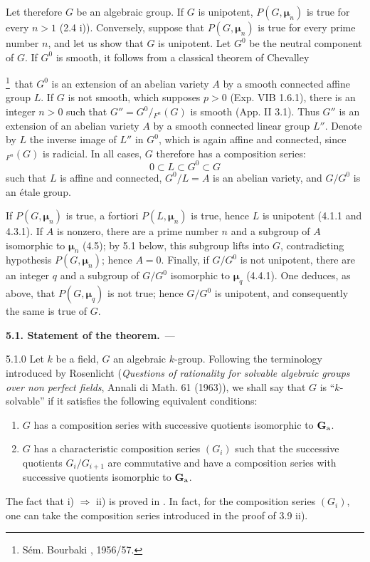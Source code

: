 Let therefore $G$ be an algebraic group. If $G$ is unipotent, $P(G,\boldsymbol\mu_n)$ is true for every $n>1$ (2.4 i)). Conversely, suppose that $P(G,\boldsymbol\mu_n)$ is true for every prime number $n$, and let us show that $G$ is unipotent. Let $G^0$ be the neutral component of $G$. If $G^0$ is smooth, it follows from a classical theorem of Chevalley\begingroup\renewcommand{\thefootnote}{*}\addtocounter{footnote}{-1}\footnote{Sém. Bourbaki , 1956/57.}\endgroup\ that $G^0$ is an extension of an abelian variety $A$ by a smooth connected affine group $L$. If $G$ is not smooth, which supposes $p>0$ (Exp. VIB 1.6.1), there is an integer $n>0$ such that $G''=G^0/{}_{F^n}(G)$ is smooth (App. II 3.1). Thus $G''$ is an extension of an abelian variety $A$ by a smooth connected linear group $L''$. Denote by $L$ the inverse image of $L''$ in $G^0$, which is again affine and connected, since ${}_{F^n}(G)$ is radicial. In all cases, $G$ therefore has a composition series:
\[
 0\subset L\subset G^0\subset G
\]
such that $L$ is affine and connected, $G^0/L=A$ is an abelian variety, and $G/G^0$ is an étale group.

If $P(G,\boldsymbol\mu_n)$ is true, a fortiori $P(L,\boldsymbol\mu_n)$ is true, hence $L$ is unipotent (4.1.1 and 4.3.1). If $A$ is nonzero, there are a prime number $n$ and a subgroup of $A$ isomorphic to $\boldsymbol\mu_n$ (4.5); by 5.1 below, this subgroup lifts into $G$, contradicting hypothesis $P(G,\boldsymbol\mu_n)$; hence $A=0$. Finally, if $G/G^0$ is not unipotent, there are an integer $q$ and a subgroup of $G/G^0$ isomorphic to $\boldsymbol\mu_q$ (4.4.1).
One deduces, as above, that $P(G,\boldsymbol\mu_q)$ is not true; hence $G/G^0$ is unipotent, and consequently the same is true of $G$.

\par\medskip\noindent\textbf{5.1. Statement of the theorem.}\ ---\par\label{XVII.5.1}
\begin{definition}{5.1.0}\label{XVII.5.1.0}
Let $k$ be a field, $G$ an algebraic $k$-group. Following the terminology introduced by Rosenlicht (\emph{Questions of rationality for solvable algebraic groups over non perfect fields}, Annali di Math. 61 (1963)), we shall say that $G$ is ``$k$-solvable'' if it satisfies the following equivalent conditions:
\begin{enumerate}[label=\textup{\roman*)}]
\item $G$ has a composition series with successive quotients isomorphic to $\mathbf{G}_{\mathrm{a}}$.
\item $G$ has a characteristic composition series $(G_i)$ such that the successive quotients $G_i/G_{i+1}$ are commutative and have a composition series with successive quotients isomorphic to $\mathbf{G}_{\mathrm{a}}$.
\end{enumerate}
\end{definition}
The fact that i) $\Rightarrow$ ii) is proved in \loccit. In fact, for the composition series $(G_i)$, one can take the composition series introduced in the proof of 3.9 ii).

